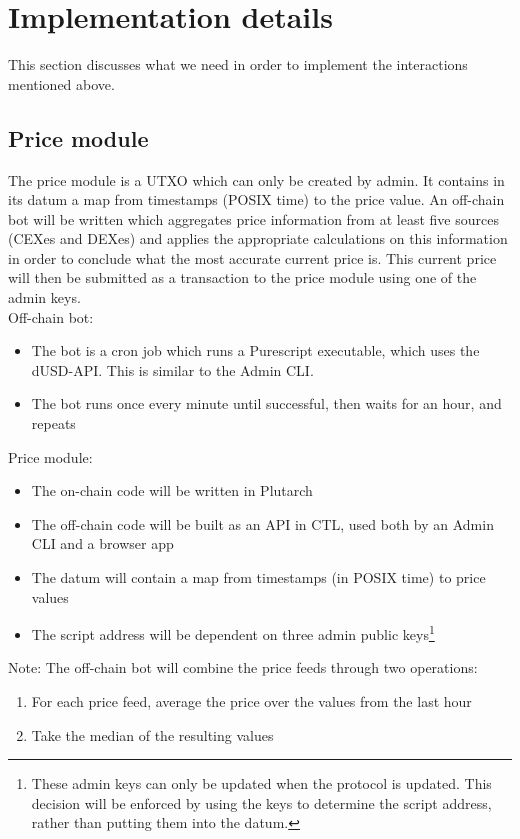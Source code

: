 \documentclass{article} %
\begin{document}
\section{Implementation details}

This section discusses what we need in order to implement the interactions
mentioned above.

\subsection{Price module}

The price module is a UTXO which can only be created by admin.
It contains in its datum a map from timestamps (POSIX time) to the price value.
An off-chain bot will be written which aggregates price information from at
least five sources (CEXes and DEXes) and applies the appropriate calculations on
this information in order to conclude what the most accurate current price is.
This current price will then be submitted as a transaction to the price module
using one of the admin keys. \\

Off-chain bot:
\begin{itemize}
  \item The bot is a cron job which runs a Purescript executable, which uses the
    dUSD-API. This is similar to the Admin CLI.
  \item The bot runs once every minute until successful, then waits for an hour,
    and repeats
\end{itemize}

Price module:
\begin{itemize}
  \item The on-chain code will be written in Plutarch
  \item The off-chain code will be built as an API in CTL, used both by an Admin
    CLI and a browser app
  \item The datum will contain a map from timestamps (in POSIX time) to price
    values
  \item The script address will be dependent on three admin public
    keys\footnote{
      These admin keys can only be updated when the protocol is updated.
      This decision will be enforced by using the keys to determine the script
      address, rather than putting them into the datum.
    }
\end{itemize}

Note: The off-chain bot will combine the price feeds through two operations:
\begin{enumerate}
  \item For each price feed, average the price over the values from the last
    hour
  \item Take the median of the resulting values
\end{enumerate}
\end{document}
